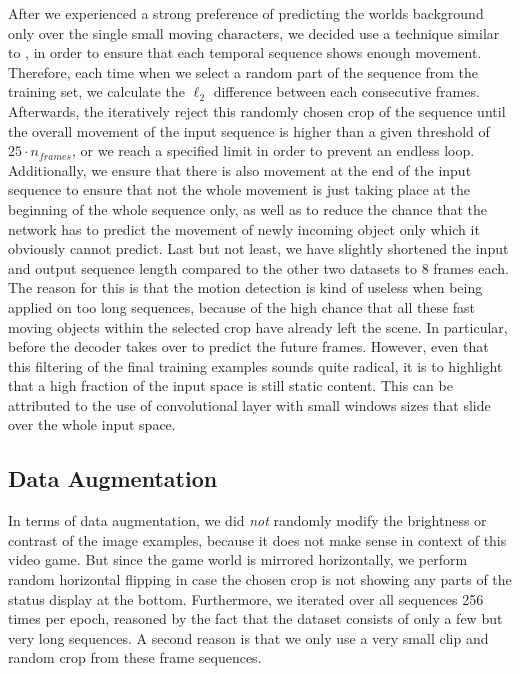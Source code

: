 After we experienced a strong preference of predicting the worlds background only over the single small moving characters, we decided use a technique similar to \parencite{deep_multiscale_video_pred}, in order to ensure that each temporal sequence shows enough movement. Therefore, each time when we select a random part of the sequence from the training set, we calculate the $\ell_2$ difference between each consecutive frames. Afterwards, the iteratively reject this randomly chosen crop of the sequence until the overall movement of the input sequence is higher than a given threshold of $25 \cdot n_{frames}$, or we reach a specified limit in order to prevent an endless loop. Additionally, we ensure that there is also movement at the end of the input sequence to ensure that not the whole movement is just taking place at the beginning of the whole sequence only, as well as to reduce the chance that the network has to predict the movement of newly incoming object only which it obviously cannot predict. Last but not least, we have slightly shortened the input and output sequence length compared to the other two datasets to \num{8} frames each. The reason for this is that the motion detection is kind of useless when being applied on too long sequences, because of the high chance that all these fast moving objects within the selected crop have already left the scene. In particular, before the decoder takes over to predict the future frames. However, even that this filtering of the final training examples sounds quite radical, it is to highlight that a high fraction of the input space is still static content. This can be attributed to the use of convolutional layer with small windows sizes that slide over the whole input space.

\subsection{Data Augmentation}

In terms of data augmentation, we did \textit{not} randomly modify the brightness or contrast of the image examples, because it does not make sense in context of this video game. But since the game world is mirrored horizontally, we perform random horizontal flipping in case the chosen crop is not showing any parts of the status display at the bottom. Furthermore, we iterated over all sequences \num{256} times per epoch, reasoned by the fact that the dataset consists of only a few but very long sequences. A second reason is that we only use a very small clip and random crop from these frame sequences. 


